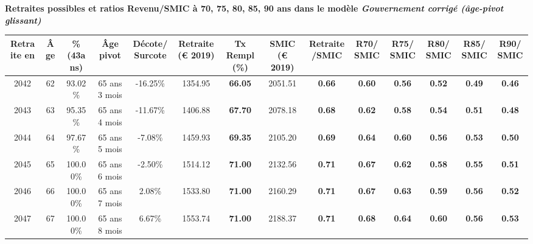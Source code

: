  \vspace{0.1cm} 
{\bf \noindent Retraites possibles et ratios Revenu/SMIC à 70, 75, 80, 85, 90 ans dans le modèle \emph{Gouvernement corrigé (âge-pivot glissant)}}  
 
\begin{adjustbox}{max width=\textwidth} 
\begin{tabular}[htb]{|c|c||c|c|c||c|c||c|c||c|c|c|c|c|} 
\hline 
 Retraite en &  Âge &  \%(43ans) &  Âge pivot &  Décote/Surcote &  Retraite (\euro{} 2019) &  Tx Rempl(\%) &  SMIC (\euro{} 2019) &  Retraite/SMIC &  R70/SMIC &  R75/SMIC &  R80/SMIC &  R85/SMIC &  R90/SMIC \\ 
\hline \hline 
 2042 &  62 &  93.02\% &  65 ans 3 mois &  -16.25\% &  1354.95 &  {\bf 66.05} &  2051.51 &  {\bf {\color{red} 0.66}} &  {\bf {\color{red} 0.60}} &  {\bf {\color{red} 0.56}} &  {\bf {\color{red} 0.52}} &  {\bf {\color{red} 0.49}} &  {\bf {\color{red} 0.46}} \\ 
\hline 
 2043 &  63 &  95.35\% &  65 ans 4 mois &  -11.67\% &  1406.88 &  {\bf 67.70} &  2078.18 &  {\bf {\color{red} 0.68}} &  {\bf {\color{red} 0.62}} &  {\bf {\color{red} 0.58}} &  {\bf {\color{red} 0.54}} &  {\bf {\color{red} 0.51}} &  {\bf {\color{red} 0.48}} \\ 
\hline 
 2044 &  64 &  97.67\% &  65 ans 5 mois &  -7.08\% &  1459.93 &  {\bf 69.35} &  2105.20 &  {\bf {\color{red} 0.69}} &  {\bf {\color{red} 0.64}} &  {\bf {\color{red} 0.60}} &  {\bf {\color{red} 0.56}} &  {\bf {\color{red} 0.53}} &  {\bf {\color{red} 0.50}} \\ 
\hline 
 2045 &  65 &  100.00\% &  65 ans 6 mois &  -2.50\% &  1514.12 &  {\bf 71.00} &  2132.56 &  {\bf {\color{red} 0.71}} &  {\bf {\color{red} 0.67}} &  {\bf {\color{red} 0.62}} &  {\bf {\color{red} 0.58}} &  {\bf {\color{red} 0.55}} &  {\bf {\color{red} 0.51}} \\ 
\hline 
 2046 &  66 &  100.00\% &  65 ans 7 mois &  2.08\% &  1533.80 &  {\bf 71.00} &  2160.29 &  {\bf {\color{red} 0.71}} &  {\bf {\color{red} 0.67}} &  {\bf {\color{red} 0.63}} &  {\bf {\color{red} 0.59}} &  {\bf {\color{red} 0.56}} &  {\bf {\color{red} 0.52}} \\ 
\hline 
 2047 &  67 &  100.00\% &  65 ans 8 mois &  6.67\% &  1553.74 &  {\bf 71.00} &  2188.37 &  {\bf {\color{red} 0.71}} &  {\bf {\color{red} 0.68}} &  {\bf {\color{red} 0.64}} &  {\bf {\color{red} 0.60}} &  {\bf {\color{red} 0.56}} &  {\bf {\color{red} 0.53}} \\ 
\hline 
\hline 
\end{tabular} 
\end{adjustbox} 
 
